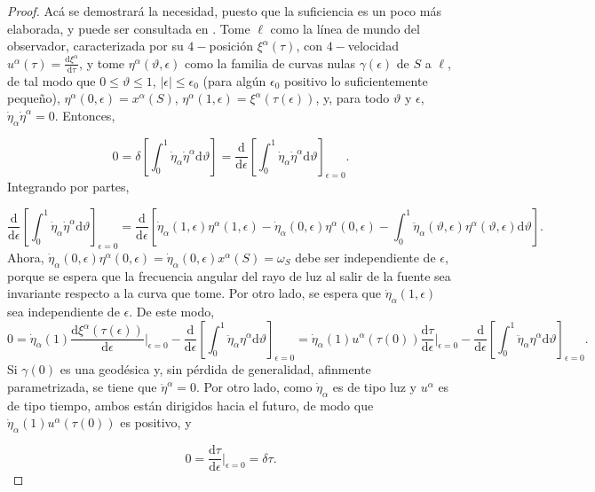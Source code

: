 \begin{proof}
Acá se demostrará la necesidad, puesto que la suficiencia es un poco más elaborada, y puede ser consultada en \cite{schneider_ehlers_falco_1992}. Tome $\ell$ como la línea de mundo del observador, caracterizada por su $4-$posición $\xi^\alpha(\tau)$, con $4-$velocidad $u^\alpha(\tau)=\frac{\mathrm{d}\xi^\alpha}{\mathrm{d}\tau}$, y tome $\eta^\alpha(\vartheta,\epsilon)$ como la familia de curvas nulas $\gamma(\epsilon)$ de $S$ a $\ell$, de tal modo que $0\leq\vartheta\leq1$, $|\epsilon|\leq \epsilon_0$ (para algún $\epsilon_0$ positivo lo suficientemente pequeño), $\eta^\alpha(0,\epsilon)=x^\alpha(S)$, $\eta^\alpha(1,\epsilon)=\xi^\alpha(\tau(\epsilon))$, y, para todo $\vartheta$ y $\epsilon$, $\dot{\eta}_\alpha\dot{\eta}^\alpha=0$. Entonces,

$$0=\delta\left[ \int_0^1 \dot{\eta}_\alpha\dot{\eta}^\alpha \mathrm{d}\vartheta  \right]=\frac{\mathrm{d}}{\mathrm{d}\epsilon}\left[ \int_0^1 \dot{\eta}_\alpha\dot{\eta}^\alpha \mathrm{d}\vartheta  \right]_{\epsilon=0}.$$
Integrando por partes,

$$\frac{\mathrm{d}}{\mathrm{d}\epsilon}\left[ \int_0^1 \dot{\eta}_\alpha\dot{\eta}^\alpha \mathrm{d}\vartheta  \right]_{\epsilon=0} =\frac{\mathrm{d}}{\mathrm{d}\epsilon}\left[\dot{\eta}_\alpha(1,\epsilon)\eta^\alpha(1,\epsilon)- \dot{\eta}_\alpha(0,\epsilon)\eta^\alpha(0,\epsilon)-\int_0^1 \ddot{\eta}_\alpha(\vartheta,\epsilon) \eta^\alpha(\vartheta,\epsilon) \mathrm{d}\vartheta\right].$$
Ahora, $\dot{\eta}_\alpha(0,\epsilon)\eta^\alpha(0,\epsilon)=\dot{\eta}_\alpha(0,\epsilon)x^\alpha(S)=\omega_S$ debe ser independiente de $\epsilon$, porque se espera que la frecuencia angular del rayo de luz al salir de la fuente sea invariante respecto a la curva que tome. Por otro lado, se espera que $\dot{\eta}_\alpha(1,\epsilon)$ sea independiente de $\epsilon$. De este modo,
$$0=\dot{\eta}_\alpha(1)\frac{\mathrm{d}\xi^\alpha(\tau(\epsilon))}{\mathrm{d}\epsilon}\Big|_{\epsilon=0}-\frac{\mathrm{d}}{\mathrm{d}\epsilon}\left[ \int_0^1 \ddot{\eta}_\alpha \eta^\alpha\mathrm{d}\vartheta \right]_{\epsilon=0}=\dot{\eta}_\alpha(1)u^\alpha(\tau(0))\frac{\mathrm{d}\tau}{\mathrm{d}\epsilon}\Big|_{\epsilon=0}-\frac{\mathrm{d}}{\mathrm{d}\epsilon}\left[ \int_0^1 \ddot{\eta}_\alpha \eta^\alpha\mathrm{d}\vartheta \right]_{\epsilon=0}.$$
Si $\gamma(0)$ es una geodésica y, sin pérdida de generalidad, afinmente parametrizada, se tiene que $\ddot{\eta}^\alpha=0$. Por otro lado, como $\dot{\eta}_\alpha$ es de tipo luz y $u^{\alpha}$ es de tipo tiempo, ambos están dirigidos hacia el futuro, de modo que $\dot{\eta}_\alpha(1)u^\alpha(\tau(0))$ es positivo, y

$$0=\frac{\mathrm{d}\tau}{\mathrm{d}\epsilon}\Big|_{\epsilon=0}=\delta\tau.$$
\end{proof}